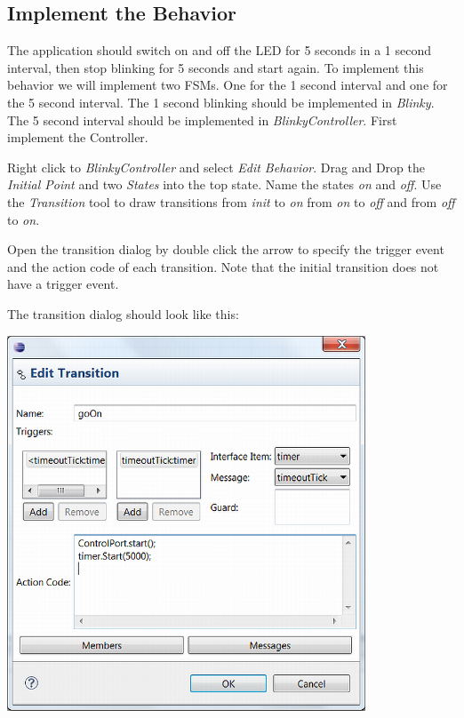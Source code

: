\subsection{Implement the Behavior}

The application should switch on and off the LED for 5 seconds in a 1 second interval, then stop blinking 
for 5 seconds and start again. To implement this behavior we will implement two FSMs. One for the 1 second 
interval and one for the 5 second interval. The 1 second blinking should be implemented in 
\textit{Blinky}. The 5 second interval should be implemented in \textit{BlinkyController}. First implement 
the Controller.

Right click to \textit{BlinkyController} and select \textit{Edit Behavior}.
Drag and Drop the \textit{Initial Point} and two \textit{States} into the top state. Name the states 
\textit{on} and \textit{off}. 
Use the \textit{Transition} tool to draw transitions from \textit{init} to \textit{on} from \textit{on} to 
\textit{off} and from \textit{off} to \textit{on}.

Open the transition dialog by double click the arrow to specify the trigger event and the action code of 
each transition. Note that the initial transition does not have a trigger event.

The transition dialog should look like this:

\includegraphics[width=0.8\textwidth]{images/020-Blinky09.png}

